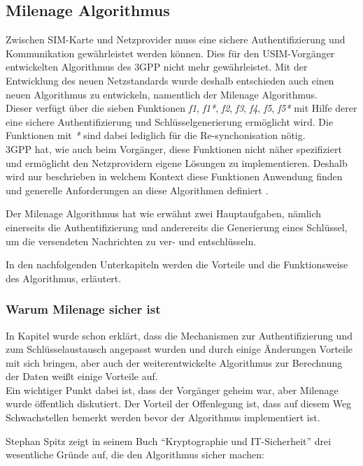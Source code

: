 \subsection{Milenage Algorithmus}
\label{milenage}
Zwischen \ac{SIM}-Karte und Netzprovider muss eine sichere Authentifizierung und
Kommunikation gewährleistet werden können. Dies für den USIM-Vorgänger entwickelten Algorithmus des \ac{3GPP} nicht mehr
gewährleistet. Mit der Entwicklung des neuen Netzstandards wurde deshalb entschieden
auch einen neuen Algorithmus zu entwickeln, namentlich der Milenage Algorithmus. \\
Dieser verfügt über die sieben Funktionen \emph{f1}, \emph{f1*}, \emph{f2}, \emph{f3},
\emph{f4}, \emph{f5}, \emph{f5*} mit Hilfe derer eine sichere Authentifizierung und
Schlüsselgenerierung ermöglicht wird. Die Funktionen mit \emph{*} sind dabei lediglich für die
Re-synchonisation nötig. \\
3GPP hat, wie auch beim Vorgänger, diese Funktionen nicht näher spezifiziert und ermöglicht
den Netzprovidern eigene Lösungen zu implementieren. Deshalb wird nur beschrieben in
welchem Kontext diese Funktionen Anwendung finden und generelle Anforderungen
an diese Algorithmen definiert \cite{3gpp.35.205}.

Der Milenage Algorithmus hat wie erwähnt zwei Hauptaufgaben, nämlich einerseits die
Authentifizierung und anderereits die Generierung eines Schlüssel, um die versendeten Nachrichten zu
ver- und entschlüsseln.

In den nachfolgenden Unterkapiteln werden die Vorteile und die Funktionsweise des
Algorithmus, erläutert.

 \subsubsection{Warum Milenage sicher ist}
 In Kapitel  wurde schon erklärt, dass die Mechanismen
 zur Authentifizierung und zum Schlüsselaustausch angepasst wurden und durch einige
 Änderungen Vorteile mit sich bringen, aber auch der weiterentwickelte Algorithmus zur
 Berechnung der Daten weißt einige Vorteile auf. \\
 Ein wichtiger Punkt dabei ist, dass der Vorgänger geheim war, aber Milenage wurde öffentlich
 diskutiert. Der Vorteil der Offenlegung ist, dass auf diesem Weg Schwachstellen bemerkt werden
 bevor der Algorithmus implementiert ist. 
 
 Stephan Spitz zeigt in seinem Buch ``Kryptographie und IT-Sicherheit'' \cite{spitz11} drei
 wesentliche Gründe auf, die den Algorithmus sicher machen:
 
